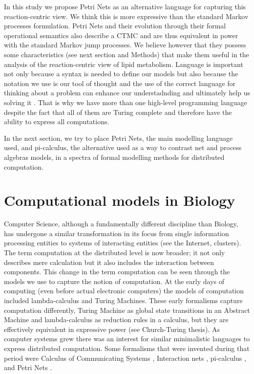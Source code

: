 In this study we propose Petri Nets as an alternative language for capturing this
reaction-centric view. We think this is more expressive than the
standard Markov processes formulation. Petri Nets and their
evolution through their formal operational semantics also describe a
CTMC and are thus equivalent in power with the standard Markov jump
processes. We believe however that they possess some characteristics (see next
section and Methods) that make them useful in the analysis of the
reaction-centric view of lipid metabolism. Language is important not
only because a syntax is needed to define our models but also because
the notation we use is our tool of thought and the use of the correct
language for thinking about a problem can enhance our understadnding
and ultimately help us solving it \cite [] {iverson2007notation}. That is why we have more
than one high-level programming language despite the fact that all of
them are Turing complete and therefore have the ability to express all
computations.

In the next section, we try to place Petri Nets, the main modelling
language used, and pi-calculus, the alternative used as a way to
contrast net and process algebras models, in a spectra of formal
modelling methods for distributed computation.

\section{Computational models in Biology}
Computer Science, although a fundamentally different discipline than
Biology, has undergone a similar transformation in its focus from
single information processing entities to systems of interacting
entities (see the Internet, clusters). The term computation at the
distributed level is now broader; it not only describes mere
calculation but it also includes the interaction between
components. This change in the term computation can be seen through
the models we use to capture the notion of computation. At the early
days of computing (even before actual electronic computers) the models
of computation included lambda-calculus and Turing Machines. These
early formalisms capture computation differently, Turing Machine as
global state transitions in an Abstract Machine and lambda-calculus
as reduction rules in a calculus, but they are effectively equivalent
in expressive power (see Church-Turing thesis). As computer systems
grew there was an interest for similar
minimalistic languages to express distributed computation. Some
formalisms that were invented during that period were
Calculus of Communicating Systems \cite [] {milner1980calculus},
Interaction nets \cite [] {lafont1989interaction},
pi-calculus \cite [] {milner1992calculus} , and Petri
Nets \cite [] {murata1989petri}.

